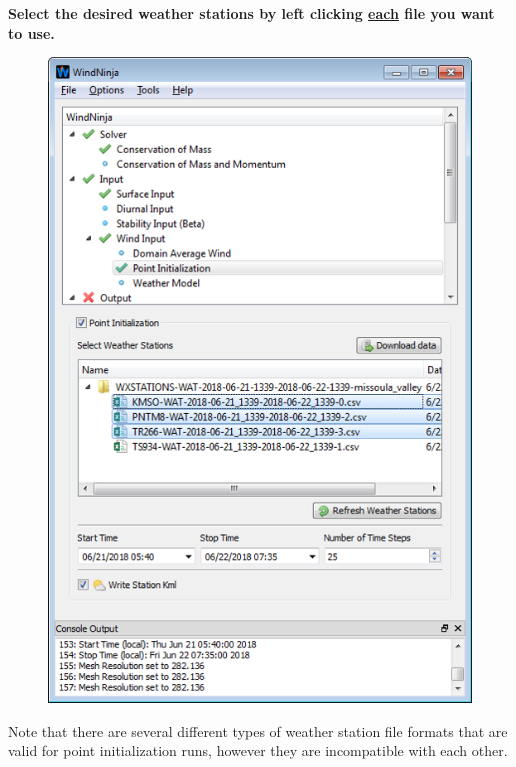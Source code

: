 \documentclass[12pt]{article}
\begin{document}
\textbf{\color{red}Select the desired weather stations by left clicking \underline{each} file you want to use.}

\begin{figure}[H]
	\centering
	\label{}
	\includegraphics[scale=1.0]{PI-Select-Blue_1}
\end{figure}

Note that there are several different types of weather station file formats that are valid  for point initialization runs, however they are incompatible with each other.
\end{document}
